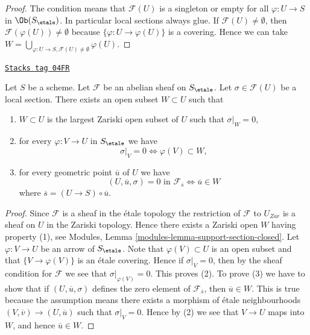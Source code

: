 \begin{proof}
The condition means that $\mathcal{F}(U)$ is a singleton or
empty for all $\varphi : U \to S$ in $\Ob(S_\etale)$.
In particular local sections always glue. If
$\mathcal{F}(U) \not = \emptyset$, then
$\mathcal{F}(\varphi(U)) \not = \emptyset$ because
$\{\varphi : U \to \varphi(U)\}$ is a covering.
Hence we can take
$W = \bigcup_{\varphi : U \to S, \mathcal{F}(U) \not = \emptyset} \varphi(U)$.
\end{proof}

\begin{lemma}
\label{etale-cohomology-lemma-zero-over-image}
\href{https://stacks.math.columbia.edu/tag/04FR}{\texttt{Stacks tag 04FR}}

Let $S$ be a scheme.
Let $\mathcal{F}$ be an abelian sheaf on $S_\etale$.
Let $\sigma \in \mathcal{F}(U)$ be a local section.
There exists an open subset $W \subset U$ such that
\begin{enumerate}
\item $W \subset U$ is the largest Zariski open subset of $U$ such
that $\sigma|_W = 0$,
\item for every $\varphi : V \to U$ in $S_\etale$ we have
$$
\sigma|_V = 0 \Leftrightarrow \varphi(V) \subset W,
$$
\item for every geometric point $\overline{u}$ of $U$ we have
$$
(U, \overline{u}, \sigma) = 0\text{ in }\mathcal{F}_{\overline{s}}
\Leftrightarrow
\overline{u} \in W
$$
where $\overline{s} = (U \to S) \circ \overline{u}$.
\end{enumerate}
\end{lemma}

\begin{proof}
Since $\mathcal{F}$ is a sheaf in the \'etale topology the restriction of
$\mathcal{F}$ to $U_{Zar}$ is a sheaf on $U$ in the Zariski topology.
Hence there exists a Zariski open $W$ having property (1), see
Modules, Lemma \ref{modules-lemma-support-section-closed}. Let
$\varphi : V \to U$ be an arrow of $S_\etale$. Note that
$\varphi(V) \subset U$ is an open subset and that
$\{V \to \varphi(V)\}$ is an \'etale covering. Hence if
$\sigma|_V = 0$, then by the sheaf condition for $\mathcal{F}$ we
see that $\sigma|_{\varphi(V)} = 0$. This proves (2).
To prove (3) we have to show that if $(U, \overline{u}, \sigma)$
defines the zero element of $\mathcal{F}_{\overline{s}}$, then
$\overline{u} \in W$. This is true because the assumption means
there exists a morphism of \'etale neighbourhoods
$(V, \overline{v}) \to (U, \overline{u})$ such that
$\sigma|_V = 0$. Hence by (2) we see that $V \to U$ maps into $W$, and
hence $\overline{u} \in W$.
\end{proof}

